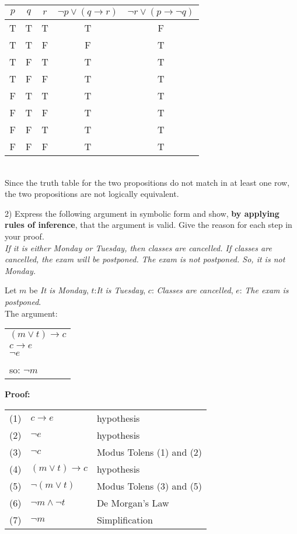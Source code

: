 \documentclass[11pt]{amsart}
\begin{document}
{\color{blue}
\begin{tabular}{c  c  c |  c | c}
$p$ & $q$ & $r$ &    $\lnot p \lor(q \to r)$ &  $\lnot r\lor (p\to \lnot q)$ \\
\hline
T & T & T &   T &   F  \\
T & T & F &   F &   T \\
T & F & T &   T &    T  \\
T & F & F &   T &  T  \\
F & T & T &   T &  T  \\
F & T & F &   T &  T  \\
F & F & T &   T &  T  \\
F & F & F &   T &  T  \\
\end{tabular}\\[3pt]

Since the truth table for the two propositions do not match in at least one row, the two propositions are not
logically equivalent.\\[5pt]
}

\vfill

2) Express the following argument in symbolic form and show, {\bf by applying rules of inference}, that
the argument is valid. Give the reason for each step in your proof.\\[3pt]


{\itshape If it is either Monday or Tuesday, then  classes are cancelled.  If classes are cancelled, the exam will be postponed. 
The exam is not postponed. So, it is not Monday. }\\[3pt]

{\color{blue}
Let $m$ be {\itshape It is Monday}, $t$:{\itshape It is Tuesday}, $c$: {\itshape Classes are cancelled}, $e$: {\itshape The exam is postponed}.\\[2pt]

The argument:

\begin{tabular}[t]{l}
   $(m\lor t) \to c$\\
   $c \to e$\\
   $\lnot e$\\
   \vrule width .75in depth 0pt height .5pt\\
   so: $\lnot m$
   \end{tabular}
 \qquad\textbf{Proof:}
 \begin{tabular}[t]{r l l}
 (1)& $c\to e$                   & hypothesis\\
 (2)& $\lnot e$      & hypothesis\\
 (3)& $\lnot c$                   & Modus Tolens (1) and (2)\\
 (4)& $(m\lor t) \to c$ & hypothesis\\
 (5)& $\lnot(m \lor t)$ & Modus Tolens (3) and (5)\\
 (6)& $\lnot m \land \lnot t$     & De Morgan's Law\\      
 (7)& $\lnot m$             & Simplification\\
 \end{tabular}\\[5pt]
}
\end{document}
